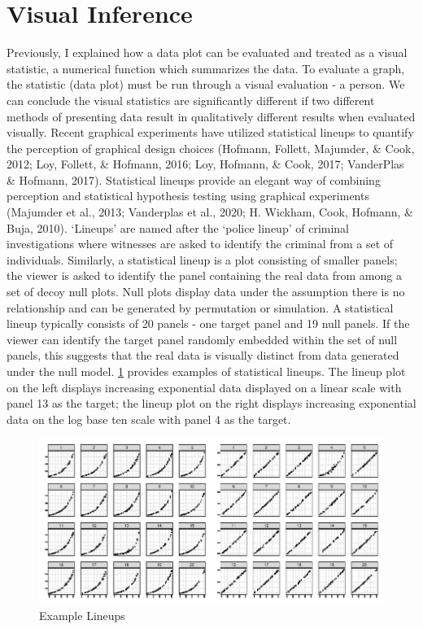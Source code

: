 \documentclass[print]{nuthesis}
\begin{document}
\hypertarget{visual-inference}{%
\section{Visual Inference}\label{visual-inference}}

Previously, I explained how a data plot can be evaluated and treated as a visual statistic, a numerical function which summarizes the data.
To evaluate a graph, the statistic (data plot) must be run through a visual evaluation - a person.
We can conclude the visual statistics are significantly different if two different methods of presenting data result in qualitatively different results when evaluated visually.
Recent graphical experiments have utilized statistical lineups to quantify the perception of graphical design choices (Hofmann, Follett, Majumder, \& Cook, 2012; Loy, Follett, \& Hofmann, 2016; Loy, Hofmann, \& Cook, 2017; VanderPlas \& Hofmann, 2017).
Statistical lineups provide an elegant way of combining perception and statistical hypothesis testing using graphical experiments (Majumder et al., 2013; Vanderplas et al., 2020; H. Wickham, Cook, Hofmann, \& Buja, 2010).
`Lineups' are named after the `police lineup' of criminal investigations where witnesses are asked to identify the criminal from a set of individuals.
Similarly, a statistical lineup is a plot consisting of smaller panels; the viewer is asked to identify the panel containing the real data from among a set of decoy null plots.
Null plots display data under the assumption there is no relationship and can be generated by permutation or simulation.
A statistical lineup typically consists of 20 panels - one target panel and 19 null panels.
If the viewer can identify the target panel randomly embedded within the set of null panels, this suggests that the real data is visually distinct from data generated under the null model.
\cref{fig:lineup-example} provides examples of statistical lineups.
The lineup plot on the left displays increasing exponential data displayed on a linear scale with panel 13 as the target; the lineup plot on the right displays increasing exponential data on the log base ten scale with panel 4 as the target.

\begin{figure}[tbp]

{\centering \includegraphics[width=\linewidth,]{thesis_files/figure-latex/lineup-example-1} 

}

\caption{Example Lineups}\label{fig:lineup-example}
\end{figure}
\end{document}
